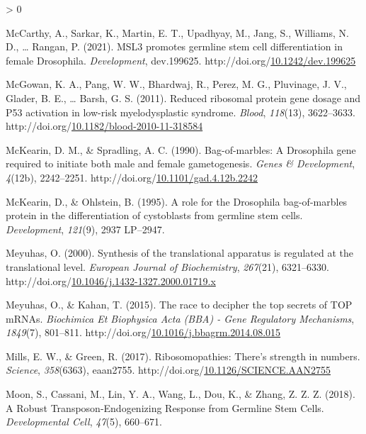 \documentclass[12pt,oneside]{reedthesis}
\newlength{\cslhangindent}
\newenvironment{CSLReferences}[2] %
 {%
  \setlength{\parindent}{0pt}
  \ifodd #1 \everypar{\setlength{\hangindent}{\cslhangindent}}\ignorespaces\fi
  \ifnum #2 > 0
  \setlength{\parskip}{#2\baselineskip}
  \fi
 }%
 {}
\begin{document}
\begin{CSLReferences}{1}{0}
\leavevmode\hypertarget{ref-mccarthyMSL3PromotesGermline2021}{}%
McCarthy, A., Sarkar, K., Martin, E. T., Upadhyay, M., Jang, S., Williams, N. D., \ldots{} Rangan, P. (2021). {MSL3} promotes germline stem cell differentiation in female {Drosophila}. \emph{Development}, dev.199625. http://doi.org/\href{https://doi.org/10.1242/dev.199625}{10.1242/dev.199625}

\leavevmode\hypertarget{ref-mcgowanReducedRibosomalProtein2011}{}%
McGowan, K. A., Pang, W. W., Bhardwaj, R., Perez, M. G., Pluvinage, J. V., Glader, B. E., \ldots{} Barsh, G. S. (2011). Reduced ribosomal protein gene dosage and P53 activation in low-risk myelodysplastic syndrome. \emph{Blood}, \emph{118}(13), 3622--3633. http://doi.org/\href{https://doi.org/10.1182/blood-2010-11-318584}{10.1182/blood-2010-11-318584}

\leavevmode\hypertarget{ref-McKearin1990e}{}%
McKearin, D. M., \& Spradling, A. C. (1990). Bag-of-marbles: A {Drosophila} gene required to initiate both male and female gametogenesis. \emph{Genes \& Development}, \emph{4}(12b), 2242--2251. http://doi.org/\href{https://doi.org/10.1101/gad.4.12b.2242}{10.1101/gad.4.12b.2242}

\leavevmode\hypertarget{ref-McKearin1995b}{}%
McKearin, D., \& Ohlstein, B. (1995). A role for the {Drosophila} bag-of-marbles protein in the differentiation of cystoblasts from germline stem cells. \emph{Development}, \emph{121}(9), 2937 LP--2947.

\leavevmode\hypertarget{ref-meyuhasSynthesisTranslationalApparatus2000}{}%
Meyuhas, O. (2000). Synthesis of the translational apparatus is regulated at the translational level. \emph{European Journal of Biochemistry}, \emph{267}(21), 6321--6330. http://doi.org/\href{https://doi.org/10.1046/j.1432-1327.2000.01719.x}{10.1046/j.1432-1327.2000.01719.x}

\leavevmode\hypertarget{ref-meyuhasRaceDecipherTop2015}{}%
Meyuhas, O., \& Kahan, T. (2015). The race to decipher the top secrets of {TOP mRNAs}. \emph{Biochimica Et Biophysica Acta (BBA) - Gene Regulatory Mechanisms}, \emph{1849}(7), 801--811. http://doi.org/\href{https://doi.org/10.1016/j.bbagrm.2014.08.015}{10.1016/j.bbagrm.2014.08.015}

\leavevmode\hypertarget{ref-Mills2017c}{}%
Mills, E. W., \& Green, R. (2017). Ribosomopathies: {There}'s strength in numbers. \emph{Science}, \emph{358}(6363), eaan2755. http://doi.org/\href{https://doi.org/10.1126/SCIENCE.AAN2755}{10.1126/SCIENCE.AAN2755}

\leavevmode\hypertarget{ref-Moon2018a}{}%
Moon, S., Cassani, M., Lin, Y. A., Wang, L., Dou, K., \& Zhang, Z. Z. Z. (2018). A {Robust Transposon-Endogenizing Response} from {Germline Stem Cells}. \emph{Developmental Cell}, \emph{47}(5), 660--671.


\end{CSLReferences}
\end{document}
